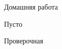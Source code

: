 
\begin{homework}[number=3]
	\begin{listofex}
		\item Домашняя работа
	\end{listofex}
\end{homework}

\begin{class}[number=4]
	\begin{listofex}
		\item Пусто
	\end{listofex}
\end{class}


\begin{exam}
	\begin{listofex}
		\item Проверочная
	\end{listofex}
\end{exam}
